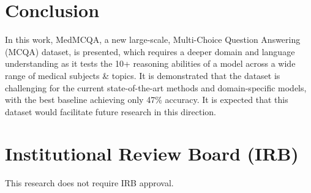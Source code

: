 \documentclass[pmlr,twocolumn,10pt]{jmlr}
\begin{document}
\begin{table}[t!]
\small
    \centering
    \caption{Performance of all baseline models in accuracy (\%) on MedMCQA test-dev set
    }
    \label{tab:acc}
\end{table}





\section{Conclusion}

In this work, MedMCQA, a new large-scale, Multi-Choice Question Answering (MCQA) dataset, is presented, which requires a deeper domain and language understanding as it tests the 10+ reasoning abilities of a model across a wide range of medical subjects \& topics. It is demonstrated that the dataset is challenging for the current state-of-the-art methods and domain-specific models, with the best baseline achieving only 47\% accuracy. It is expected that this dataset would facilitate future research in this direction.

\section*{Institutional Review Board (IRB)}
This research does not require IRB approval.

\appendix
\end{document}
